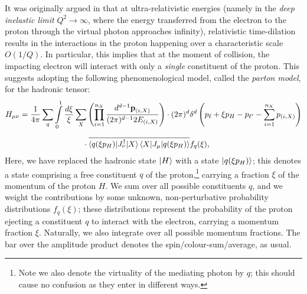 \documentclass[withindex,glossary]{cam-thesis}
\renewcommand{\vec}[1]{\textbf{#1}} %
\begin{document}
It was originally argued in \cite{Feynman:1969wa} that at ultra-relativistic energies (namely in the \textit{deep inelastic limit} $Q^2 \rightarrow \infty$, where the energy transferred from the electron to the proton through the virtual photon approaches infinity), relativistic time-dilation results in the interactions in the proton happening over a characteristic scale $O(1/Q)$. In particular, this implies that at the moment of collision, the impacting electron will interact with only a \textit{single} constituent of the proton. This suggests adopting the following phenomenological model, called the \textit{parton model}, for the hadronic tensor:
\begin{align}
\label{eq:parton_model_hadronic_tensor}
H_{\mu\nu} &= \frac{1}{4\pi} \sum_{q} \int\limits_{0}^{1} \frac{d\xi}{\xi} \sum_{X} \left(\prod_{i=1}^{n_X} \frac{d^{d-1} \vec{p}_{(i,X)}}{(2\pi)^{d-1} 2E_{(i,X)}}\right) \cdot (2\pi)^d \delta^d\left(p_\ell + \xi p_H - p_{\ell'} - \sum_{i=1}^{n_X} p_{(i,X)}\right)\notag \\[1.5ex]
&\qquad\qquad\qquad\qquad \cdot \overline{\braket{q(\xi p_H) | J_{\nu}^{\dagger} | X}\braket{X | J_{\mu} | q(\xi p_H) }} f_q(\xi),
\end{align}
Here, we have replaced the hadronic state $\ket{H}$ with a state $\ket{q(\xi p_H)}$; this denotes a state comprising a free constituent $q$ of the proton,\footnote{Note we also denote the virtuality of the mediating photon by $q$; this should cause no confusion as they enter in different ways.} carrying a fraction $\xi$ of the momentum of the proton $H$. We sum over all possible constituents $q$, and we weight the contributions by some unknown, non-perturbative probability distributions $f_q(\xi)$; these distributions represent the probability of the proton ejecting a constituent $q$ to interact with the electron, carrying a momentum fraction $\xi$. Naturally, we also integrate over all possible momentum fractions. The bar over the amplitude product denotes the spin/colour-sum/average, as usual.
\end{document}
